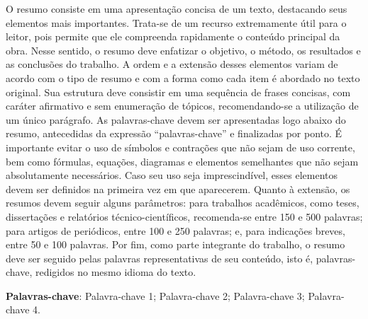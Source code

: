 
\begin{resumo}

    O resumo consiste em uma apresentação concisa de um texto, destacando seus elementos mais importantes. Trata-se de um recurso extremamente útil para o leitor, pois permite que ele compreenda rapidamente o conteúdo principal da obra.
    Nesse sentido, o resumo deve enfatizar o objetivo, o método, os resultados e as conclusões do trabalho. A ordem e a extensão desses elementos variam de acordo com o tipo de resumo e com a forma como cada item é abordado no texto original.
    Sua estrutura deve consistir em uma sequência de frases concisas, com caráter afirmativo e sem enumeração de tópicos, recomendando-se a utilização de um único parágrafo. As palavras-chave devem ser apresentadas logo abaixo do resumo, antecedidas da expressão “palavras-chave” e finalizadas por ponto.
    É importante evitar o uso de símbolos e contrações que não sejam de uso corrente, bem como fórmulas, equações, diagramas e elementos semelhantes que não sejam absolutamente necessários. Caso seu uso seja imprescindível, esses elementos devem ser definidos na primeira vez em que aparecerem.
    Quanto à extensão, os resumos devem seguir alguns parâmetros: para trabalhos acadêmicos, como teses, dissertações e relatórios técnico-científicos, recomenda-se entre 150 e 500 palavras; para artigos de periódicos, entre 100 e 250 palavras; e, para indicações breves, entre 50 e 100 palavras.
    Por fim, como parte integrante do trabalho, o resumo deve ser seguido pelas palavras representativas de seu conteúdo, isto é, palavras-chave, redigidos no mesmo idioma do texto.

    \par\vspace{\baselineskip}

    \textbf{Palavras-chave}: Palavra-chave 1; Palavra-chave 2; Palavra-chave 3; Palavra-chave 4.
\end{resumo}


